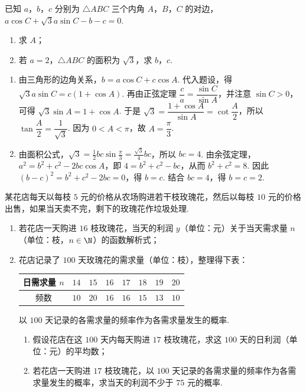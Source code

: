 \begin{problem}
已知 \(a\)，\(b\)，\(c\) 分别为 \(\triangle ABC\) 三个内角 \(A\)，\(B\)，\(C\) 的对边，\(a \cos C + \sqrt{3} a \sin C - b - c = 0\).

\begin{enumerate}
\item 求 \(A\)；
\item 若 \(a = 2\)，\(\triangle ABC\) 的面积为 \(\sqrt{3}\)，求 \(b\)，\(c\).
\end{enumerate}
\end{problem}

\begin{solution}
\begin{enumerate}
\item 由三角形的边角关系，\(b=a\cos C+c\cos A\). 代入题设，得 \(\sqrt3a\sin C=c(1+\cos A)\). 再由正弦定理 \(\dfrac ca=\dfrac{\sin C}{\sin A}\)，并注意 \(\sin C>0\)，可得 \(\sqrt3\sin A=1+\cos A\). 于是 \(\sqrt3=\dfrac{1+\cos A}{\sin A}=\cot\dfrac A2\)，所以 \(\tan\dfrac A2=\dfrac1{\sqrt3}\). 因为 \(0<A<\pi\)，故 \(A=\dfrac\pi3\).
\item 由面积公式，\(\sqrt3=\frac12bc\sin\frac\pi3=\frac{\sqrt3}{4}bc\)，所以 \(bc=4\). 由余弦定理，\(a^2=b^2+c^2-2bc\cos A\)，即 \(4=b^2+c^2-bc\)，从而 \(b^2+c^2=8\). 因此 \((b-c)^2=b^2+c^2-2bc=0\)，得 \(b=c\). 结合 \(bc=4\)，得 \(b=c=2\).
\end{enumerate}
\end{solution}

\begin{problem}
某花店每天以每枝 \(5\) 元的价格从农场购进若干枝玫瑰花，然后以每枝 \(10\) 元的价格出售，如果当天卖不完，剩下的玫瑰花作垃圾处理.

\begin{enumerate}
\item 若花店一天购进 \(16\) 枝玫瑰花，当天的利润 \(y\)（单位：元）关于当天需求量 \(n\)（单位：枝，\(n \in \N\)）的函数解析式；
\item 花店记录了 \(100\) 天玫瑰花的需求量（单位：枝），整理得下表：

\begin{center}
\renewcommand{\arraystretch}{1.2}
\begin{tabular}{|c|c|c|c|c|c|c|c|}
\hline
日需求量 \(n\) & \(14\) & \(15\) & \(16\) & \(17\) & \(18\) & \(19\) & \(20\) \\
\hline
频数 & \(10\) & \(20\) & \(16\) & \(16\) & \(15\) & \(13\) & \(10\) \\
\hline
\end{tabular}
\end{center}

以 \(100\) 天记录的各需求量的频率作为各需求量发生的概率.

\begin{enumerate}
\item 假设花店在这 \(100\) 天内每天购进 \(17\) 枝玫瑰花，求这 \(100\) 天的日利润（单位：元）的平均数；
\item 若花店一天购进 \(17\) 枝玫瑰花，以 \(100\) 天记录的各需求量的频率作为各需求量发生的概率，求当天的利润不少于 \(75\) 元的概率.
\end{enumerate}
\end{enumerate}
\end{problem}

